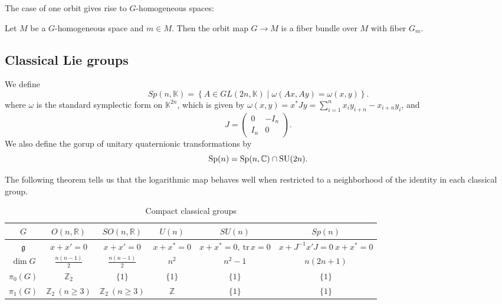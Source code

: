 \documentclass{report}
\begin{document}
The case of one orbit gives rise to $G$-homogeneous spaces:
\begin{theorem}
    Let $M$ be a $G$-homogeneous space and $m \in M$.
    Then the orbit map $G \to M$ is a fiber bundle over $M$ with fiber $G_m$.
\end{theorem}

\subsection{Classical Lie groups}

\begin{definition}
    We define
    \[
    Sp(n, \mathbb K) = 
    \left\{
        A \in GL(2n, \mathbb K) \mid \omega(Ax, Ay) = \omega(x, y)
    \right\}.
    \]
    where $\omega$ is the standard symplectic form on $\mathbb K^{2n}$, which is given by
    $\omega(x, y) = x^* J y = \sum_{i=1}^n x_i y_{i+n} - x_{i+n}y_i$, 
    and 
    \[
    J = 
    \begin{pmatrix}
    0 & -I_n \\
    I_n & 0
    \end{pmatrix}.
    \]
    We also define the gorup of unitary quaternionic transformations by
    \[
    \operatorname{{\mathrm{Sp}}}(n) = \operatorname{{\mathrm{Sp}}}(n, \mathbb C) \cap \operatorname{{\mathrm{SU}}}(2n).
    \]
\end{definition}

The following theorem tells us that the logarithmic map behaves well when restricted to a neighborhood of the identity in each classical group.

\begin{table}[h!]
    \centering
    \begin{tabular}{c c c c c c}
        $G$ & $O(n, \mathbb{R})$ & $SO(n, \mathbb{R})$ & $U(n)$ & $SU(n)$ & $Sp(n)$ \\
        \hline \hline
        $\mathfrak{g}$ & $x + x' = 0$ & $x + x' = 0$ & $x + x^* = 0$ & $x + x^* = 0, \ \text{tr} \, x = 0$ & $x + J^{-1}x'J = 0 \ x + x^* = 0$ \\
        $\dim G$ & $\frac{n(n-1)}{2}$ & $\frac{n(n-1)}{2}$ & $n^2$ & $n^2 - 1$ & $n(2n+1)$ \\
        $\pi_0(G)$ & $\mathbb{Z}_2$ & $\{1\}$ & $\{1\}$ & $\{1\}$ & $\{1\}$ \\
        $\pi_1(G)$ & $\mathbb{Z}_2 \ (n \ge 3)$ & $\mathbb{Z}_2 \ (n \ge 3)$ & $\mathbb{Z}$ & $\{1\}$ & $\{1\}$ \\
    \end{tabular}
    \caption{Compact classical groups}
    \label{table:classical_groups}
\end{table}
\end{document}
